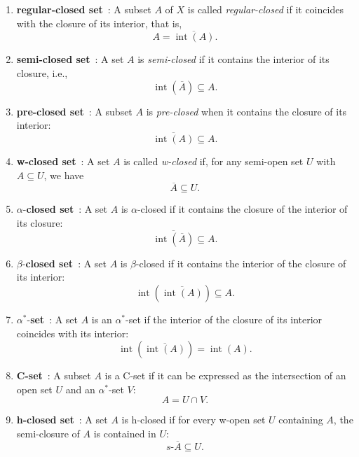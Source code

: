 \documentclass[12pt,a4paper,twoside]{report}  %
\theoremstyle{plain}
\theoremstyle{definition}
\begin{document}
\begin{enumerate}[label=(\roman*)]

\item \textbf{regular-closed set}~\cite{stone1937applications}:  
A subset \(A\) of \(X\) is called \emph{regular-closed} if it coincides with the closure of its interior, that is,
\[
A = \overline{\operatorname{int}(A)}.
\]

\item \textbf{semi-closed set}~\cite{levine1970gen}:  
A set \(A\) is \emph{semi-closed} if it contains the interior of its closure, i.e.,
\[
\operatorname{int}(\overline{A}) \subseteq A.
\]

\item \textbf{pre-closed set}~\cite{mashhour1982precontinuous}:  
A subset \(A\) is \emph{pre-closed} when it contains the closure of its interior:
\[
\overline{\operatorname{int}(A)} \subseteq A.
\]

\item \textbf{w-closed set}~\cite{Sundaram2000}:  
A set \(A\) is called \emph{w-closed} if, for any semi-open set \(U\) with \(A \subseteq U\), we have
\[
\overline{A} \subseteq U.
\]

\item \(\alpha\)-\textbf{closed set}~\cite{njȧstad1965some}:  
A set \(A\) is \(\alpha\)-closed if it contains the closure of the interior of its closure:
\[
\overline{\operatorname{int}(\overline{A})} \subseteq A.
\]

\item \(\beta\)-\textbf{closed set}~\cite{me1983beta}:  
A set \(A\) is \(\beta\)-closed if it contains the interior of the closure of its interior:
\[
\operatorname{int}(\overline{\operatorname{int}(A)}) \subseteq A.
\]

\item \(\alpha^*\)-\textbf{set}~\cite{hatir1996decomposition}:  
A set \(A\) is an \(\alpha^*\)-set if the interior of the closure of its interior coincides with its interior:
\[
\operatorname{int}(\overline{\operatorname{int}(A)}) = \operatorname{int}(A).
\]

\item \textbf{C-set}~\cite{hatir1996decomposition}:  
A subset \(A\) is a C-set if it can be expressed as the intersection of an open set \(U\) and an \(\alpha^*\)-set \(V\):
\[
A = U \cap V.
\]

\item \textbf{h-closed set}~\cite{rodrigo2012international}:  
A set \(A\) is h-closed if for every w-open set \(U\) containing \(A\), the semi-closure of \(A\) is contained in \(U\):
\[
s\text{-}\overline{A} \subseteq U.
\]


\end{enumerate}
\end{document}
